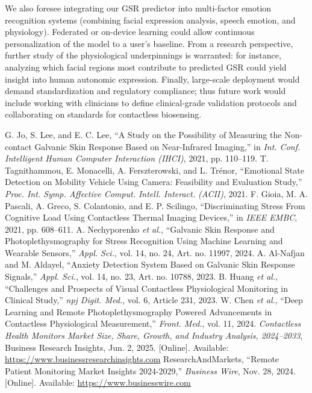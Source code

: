 \documentclass[12pt]{article}
\begin{document}
    We also foresee integrating our GSR predictor into multi-factor emotion recognition systems (combining facial expression analysis, speech emotion, and physiology). Federated or on-device learning could allow continuous personalization of the model to a user’s baseline. From a research perspective, further study of the physiological underpinnings is warranted: for instance, analyzing which facial regions most contribute to predicted GSR could yield insight into human autonomic expression. Finally, large-scale deployment would demand standardization and regulatory compliance; thus future work would include working with clinicians to define clinical-grade validation protocols and collaborating on standards for contactless biosensing.

    \begin{thebibliography}{99}
         G. Jo, S. Lee, and E. C. Lee, ``A Study on the Possibility of Measuring the Non-contact Galvanic Skin Response Based on Near-Infrared Imaging,'' in \emph{Int. Conf. Intelligent Human Computer Interaction (IHCI)}, 2021, pp. 110--119.
         T. Tagnithammou, E. Monacelli, A. Ferszterowski, and L. Trénor, ``Emotional State Detection on Mobility Vehicle Using Camera: Feasibility and Evaluation Study,'' \emph{Proc. Int. Symp. Affective Comput. Intell. Interact. (ACII)}, 2021.
         F. Gioia, M. A. Pascali, A. Greco, S. Colantonio, and E. P. Scilingo, ``Discriminating Stress From Cognitive Load Using Contactless Thermal Imaging Devices,'' in \emph{IEEE EMBC}, 2021, pp. 608--611.
         A. Nechyporenko \emph{et al.}, ``Galvanic Skin Response and Photoplethysmography for Stress Recognition Using Machine Learning and Wearable Sensors,'' \emph{Appl. Sci.}, vol. 14, no. 24, Art. no. 11997, 2024.
         A. Al-Nafjan and M. Aldayel, ``Anxiety Detection System Based on Galvanic Skin Response Signals,'' \emph{Appl. Sci.}, vol. 14, no. 23, Art. no. 10788, 2023.
         B. Huang \emph{et al.}, ``Challenges and Prospects of Visual Contactless Physiological Monitoring in Clinical Study,'' \emph{npj Digit. Med.}, vol. 6, Article 231, 2023.
         W. Chen \emph{et al.}, ``Deep Learning and Remote Photoplethysmography Powered Advancements in Contactless Physiological Measurement,'' \emph{Front. Med.}, vol. 11, 2024.
         \emph{Contactless Health Monitors Market Size, Share, Growth, and Industry Analysis, 2024--2033}, Business Research Insights, Jun. 2, 2025. [Online]. Available: \url{https://www.businessresearchinsights.com}
         ResearchAndMarkets, ``Remote Patient Monitoring Market Insights 2024-2029,'' \emph{Business Wire}, Nov. 28, 2024. [Online]. Available: \url{https://www.businesswire.com}
    \end{thebibliography}
\end{document}
